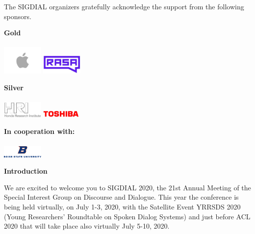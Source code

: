 {\Large The SIGDIAL organizers gratefully acknowledge the support from the following sponsors.}
\bigskip

\vspace*{1cm}

\vspace*{1cm}
\noindent
{\Large \textbf{Gold}}\\\\
\includegraphics[width=2cm]{sponsor_logos/apple.png}\hfill
\includegraphics[width=2cm]{sponsor_logos/rasa.jpg}\hfill
\vspace*{1cm}

\vspace*{1cm}
\noindent
{\Large \textbf{Silver}}\\\\
\includegraphics[width=2cm]{sponsor_logos/honda.png}\hfill
\includegraphics[width=2cm]{sponsor_logos/toshiba.jpeg}\hfill
\vspace*{1cm}

\vspace*{1cm}
\noindent
{\Large \textbf{In cooperation with:}}\\\\
\includegraphics[width=2cm]{sponsor_logos/boise.png}\hfill
\vspace*{1cm}

\newpage

\begin{center}
\Large \textbf{Introduction}\\
\end{center}
We are excited to welcome you to SIGDIAL 2020, the 21st Annual Meeting of the Special Interest Group on Discourse and Dialogue. This year the conference is being held virtually, on July 1-3, 2020, with the Satellite Event YRRSDS 2020 (Young Researchers' Roundtable on Spoken Dialog Systems) and just before ACL 2020 that will take place also virtually July 5-10, 2020.  

